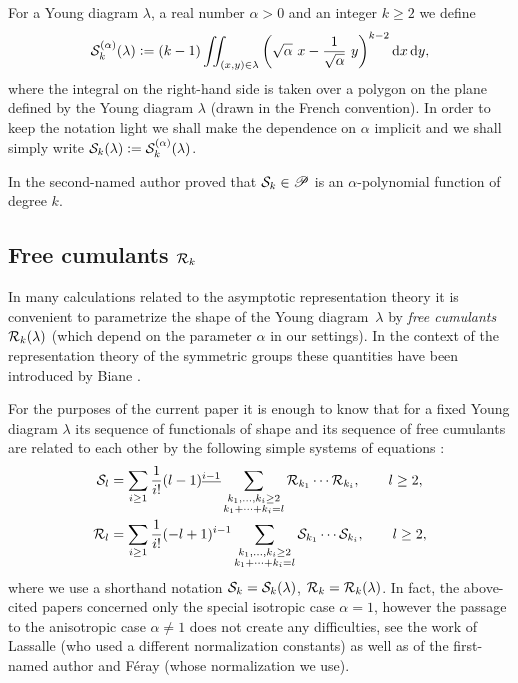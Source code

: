 \documentclass[12pt,usenames,dvipsnames,svgnames,table]{amsart}
\begin{document}
For a Young diagram $\lambda$, a real number $\alpha>0$ and an integer $k\geq 2$ we define
\[
\Sfunct_k^{(\alpha)}(\lambda):= 
(k-1) \iint_{(x,y)\in\lambda}  \left( \sqrt{\alpha}\ x-\frac{1}{\sqrt{\alpha}}\ y \right)^{k-2}  \dif x \dif y,   
\]
where the integral on the right-hand side
is taken over a polygon on the plane defined by the Young diagram $\lambda$
(drawn in the French convention).
In order to keep the notation light we shall make the dependence on $\alpha$ implicit and
we shall simply write $\mathcal{S}_k(\lambda):=\mathcal{S}_k^{(\alpha)}(\lambda)$.

\smallskip

In \cite[Proposition 4.6]{Sniady-AsymptoticsJack} the second-named author proved that 
$\mathcal{S}_k\in\mathscr{P}$ is an $\alpha$-polynomial function 
of degree $k$.

\subsection{Free cumulants $\mathcal{R}_k$}
\label{sub:FreeCumu}
In many calculations related to 
the asymptotic representation theory it is convenient to parametrize
the shape of the Young diagram~$\lambda$ by \emph{free cumulants}
$\mathcal{R}_k(\lambda)$ (which depend on the parameter $\alpha$ in our settings). In the context of the representation theory of the symmetric groups
these quantities have been introduced by Biane \cite{Biane1998}.

For the purposes of the current paper it is enough to know that
for a fixed Young diagram $\lambda$ its sequence of functionals of shape and its 
sequence of free cumulants are related to each other by the following simple systems of equations
\cite[Eqs.~(14) and (15)]{DolegaFeraySniady2008}:
\begin{align}
\label{eq:s-r}
\mathcal{S}_l &= \sum_{i\geq 1} \frac{1}{i!}  (l-1)^{\underline{i-1}} 
\sum_{\substack{k_1,\dots,k_i\geq 2 \\ k_1+\cdots+k_i=l }} \mathcal{R}_{k_1} \cdots
\mathcal{R}_{k_i}, \qquad l\geq 2,\\
\label{eq:r-s}
\mathcal{R}_{l} &=
\sum_{i\geq 1} \frac{1}{i!} (-l+1)^{i-1} \sum_{\substack{k_1,\dots,k_i\geq 2 \\
		k_1+\cdots+k_i=l }} \mathcal{S}_{k_1} \cdots \mathcal{S}_{k_i},\qquad  l\geq 2,
\end{align}
where we use a shorthand notation $\mathcal{S}_k=\mathcal{S}_k(\lambda)$,
$\mathcal{R}_k=\mathcal{R}_k(\lambda)$.
In fact, the above-cited papers \cite{Biane1998,DolegaFeraySniady2008}
concerned only the special isotropic case $\alpha=1$,
however the passage to the anisotropic case $\alpha\neq 1$ does not create any difficulties,
see the work of Lassalle \cite{Lassalle2009} (who used a different normalization constants)
as well as of the first-named author and F\'eray \cite{DolegaFeray2014} 
(whose normalization we use).
\end{document}
